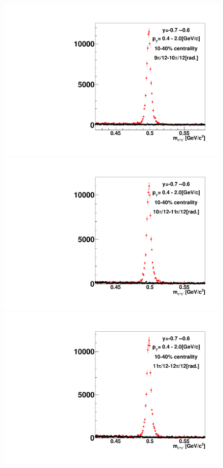 \begin{figure}[h]
\includegraphics[width=0.14\linewidth]{chapterX/fig/ks_v1_sig/kf_ptslice0_cent1_ks_flow_phi10_rap11_check.pdf}
\includegraphics[width=0.14\linewidth]{chapterX/fig/ks_v1_sig/kf_ptslice0_cent1_ks_flow_phi11_rap11_check.pdf}
\includegraphics[width=0.14\linewidth]{chapterX/fig/ks_v1_sig/kf_ptslice0_cent1_ks_flow_phi12_rap11_check.pdf}


\end{figure}

